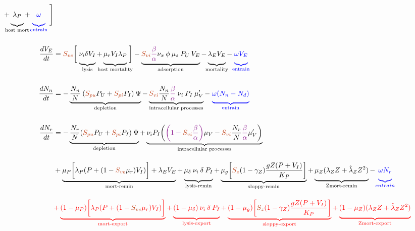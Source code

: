 \documentclass{article}
\begin{document}
\begin{align}
    + \underbrace{\vphantom{\frac{g Z}{K_P}} \lambda_P }_{\mathclap{\textrm{host mort}}} 
    + {\color{blue}\underbrace{\vphantom{\frac{g Z}{K_P}} \omega }_{\textrm{entrain}}} \; \Biggr] \\[15pt]
    \frac{dV_E}{dt} &=  {\color{Bittersweet} S_{ve}} \biggl[\; \underbrace{\vphantom{\frac{g Z}{K_P}} \nu_i \delta V_I}_{\text{lysis}} + \underbrace{\vphantom{\frac{g Z}{K_P}} \mu_r V_I \lambda_P }_{\mathclap{\text{host mortality}}} \;\biggr]
    - \underbrace{\vphantom{\frac{g Z}{K_P}} {\color{Bittersweet} S_{vi}} \textcolor{Plum}{\frac{\beta}{\alpha}} \nu_x \: \phi \: \mu_s \: P_U \: V_E}_{\text{adsorption}}
    - \underbrace{\vphantom{\frac{g Z}{K_P}} \lambda_E V_E}_{\mathclap{\text{mortality}}} 
    - {\color{blue}\underbrace{\vphantom{\frac{g Z}{K_P}} \omega V_E}_{\text{entrain}}} \\[15pt]
    \frac{dN_n}{dt} &= - \underbrace{\frac{N_n}{N} \: ({\color{Bittersweet} S_{pu}} P_U + {\color{Bittersweet} S_{pi}} P_I) \: \Psi}_{\text{depletion}}
    - \underbrace{{\color{Bittersweet} S_{vi}} \frac{N_n}{N} \textcolor{Plum}{\frac{\beta}{\alpha}} \: \nu_i \: P_I  \: \mu_V'}_{\mathclap{\text{intracellular processes}}} 
    - \; {\color{blue} \underbrace{\vphantom{\frac{N_n}{N}} \omega(N_n-N_{d})}_{\text{entrain}}} \\[15pt]
    \frac{dN_r}{dt} &=  - \underbrace{\vphantom{\frac{g Z}{K_P}} \frac{N_r}{N} ({\color{Bittersweet} S_{pu}} P_U + {\color{Bittersweet} S_{pi}} P_I) \: \Psi}_{\text{depletion}}
    + \underbrace{\vphantom{\frac{g Z}{K_P}} \nu_i P_I \biggl(\textcolor{Plum}{\biggl(1 - {\color{Bittersweet} S_{vi}} \frac{\beta}{\alpha} \biggr)} \mu_V - {\color{Bittersweet} S_{vi}} \frac{N_r}{N} \textcolor{Plum}{\frac{\beta}{\alpha}} \mu_V' \biggr)}_{\text{intracellular processes}} \\[10pt] 
    &+ \underbrace{\vphantom{\frac{g Z}{K_P}} \mu_P \biggl[ \lambda_P (P + (1- {\color{Bittersweet} S_{ve}}\mu_r) V_I) \biggr] + \lambda_E V_E}_{\text{mort-remin}} 
    + \underbrace{\vphantom{\frac{g Z}{K_P}} \mu_{\delta} \: \nu_i \: \delta \: P_I  }_{\text{lysis-remin}} 
    + \underbrace{\vphantom{\frac{g Z}{K_P}} \mu_g \biggl[ {\color{Bittersweet} S_{z}} (1 -  \gamma_Z) \frac{g Z (P+V_I)}{K_P} \biggr]}_{\text{sloppy-remin}} 
    + \underbrace{\vphantom{\frac{g Z}{K_P}} \mu_Z(\lambda_Z Z + \hat{\lambda}_Z Z^{2})}_{\text{Zmort-remin}} 
    - {\color{blue}\underbrace{\vphantom{\frac{g Z}{K_P}} \omega N_r}_{entrain}} \nonumber \\[10pt]  
    & {\color{red} + \underbrace{\vphantom{\frac{g Z}{K_P}} (1 - \mu_P) \biggl[ \lambda_P (P +  (1- {\color{Bittersweet} S_{ve}}\mu_r) V_I) \biggr]}_{\text{mort-export}} 
    + \underbrace{\vphantom{\frac{g Z}{K_P}} (1 - \mu_{\delta}) \: \nu_i \: \delta \: P_I}_{\text{lysis-export}} + \underbrace{\vphantom{\frac{g Z}{K_P}} (1 - \mu_g) \biggl[ {\color{Bittersweet} S_{z}} (1 -  \gamma_Z) \frac{g Z (P + V_I)}{K_P} \biggr]}_{\text{sloppy-export}} 
    + \underbrace{\vphantom{\frac{g Z}{K_P}} (1-\mu_Z)(\lambda_Z Z + \hat{\lambda}_Z Z^{2})}_{\text{Zmort-export}}} \nonumber 
\end{align}
\end{document}
